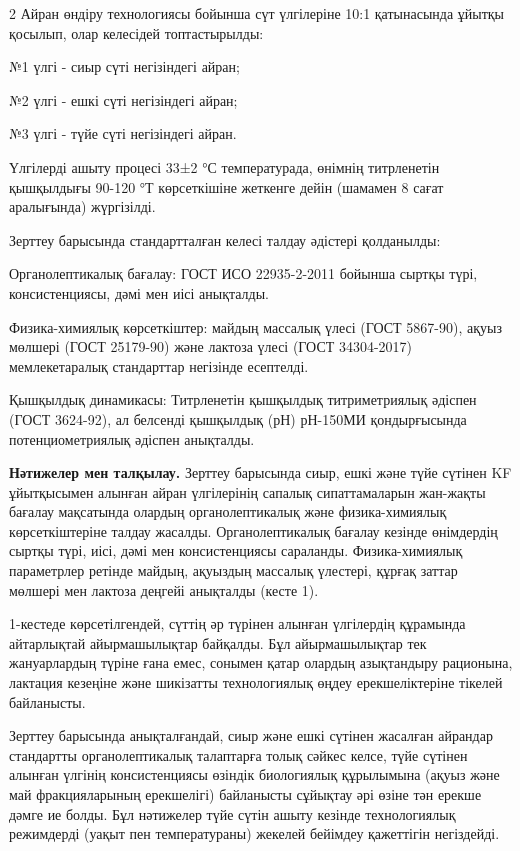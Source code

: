 \begin{multicols}{2}
Айран өндіру технологиясы бойынша сүт үлгілеріне 10:1 қатынасында ұйытқы
қосылып, олар келесідей топтастырылды:

№1 үлгі - сиыр сүті негізіндегі айран;

№2 үлгі - ешкі сүті негізіндегі айран;

№3 үлгі - түйе сүті негізіндегі айран.

Үлгілерді ашыту процесі 33±2 °С температурада, өнімнің титрленетін
қышқылдығы 90-120 °Т көрсеткішіне жеткенге дейін (шамамен 8 сағат
аралығында) жүргізілді.

Зерттеу барысында стандартталған келесі талдау әдістері қолданылды:

Органолептикалық бағалау: ГОСТ ИСО 22935-2-2011 бойынша сыртқы түрі,
консистенциясы, дәмі мен иісі анықталды.

Физика-химиялық көрсеткіштер: майдың массалық үлесі (ГОСТ 5867-90),
ақуыз мөлшері (ГОСТ 25179-90) және лактоза үлесі (ГОСТ 34304-2017)
мемлекетаралық стандарттар негізінде есептелді.

Қышқылдық динамикасы: Титрленетін қышқылдық титриметриялық әдіспен (ГОСТ
3624-92), ал белсенді қышқылдық (рН) рН-150МИ қондырғысында
потенциометриялық әдіспен анықталды.

{\bfseries Нәтижелер мен талқылау.} Зерттеу барысында сиыр, ешкі және түйе
сүтінен KF ұйытқысымен алынған айран үлгілерінің сапалық сипаттамаларын
жан-жақты бағалау мақсатында олардың органолептикалық және
физика-химиялық көрсеткіштеріне талдау жасалды. Органолептикалық бағалау
кезінде өнімдердің сыртқы түрі, иісі, дәмі мен консистенциясы сараланды.
Физика-химиялық параметрлер ретінде майдың, ақуыздың массалық үлестері,
құрғақ заттар мөлшері мен лактоза деңгейі анықталды (кесте 1).

1-кестеде көрсетілгендей, сүттің әр түрінен алынған үлгілердің құрамында
айтарлықтай айырмашылықтар байқалды. Бұл айырмашылықтар тек жануарлардың
түріне ғана емес, сонымен қатар олардың азықтандыру рационына, лактация
кезеңіне және шикізатты технологиялық өңдеу ерекшеліктеріне тікелей
байланысты.

Зерттеу барысында анықталғандай, сиыр және ешкі сүтінен жасалған
айрандар стандартты органолептикалық талаптарға толық сәйкес келсе, түйе
сүтінен алынған үлгінің консистенциясы өзіндік биологиялық құрылымына
(ақуыз және май фракцияларының ерекшелігі) байланысты сұйықтау әрі өзіне
тән ерекше дәмге ие болды. Бұл нәтижелер түйе сүтін ашыту кезінде
технологиялық режимдерді (уақыт пен температураны) жекелей бейімдеу
қажеттігін негіздейді.


\end{multicols}
